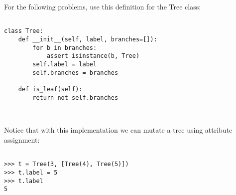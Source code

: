 For the following problems, use this definition for the Tree class:

\begin{lstlisting}

class Tree:
    def __init__(self, label, branches=[]):
        for b in branches:
            assert isinstance(b, Tree)
        self.label = label
        self.branches = branches

    def is_leaf(self):
        return not self.branches
        
        
\end{lstlisting}
\vspace{10}
Notice that with this implementation we can mutate a tree using attribute
assignment:

\begin{lstlisting}

>>> t = Tree(3, [Tree(4), Tree(5)])
>>> t.label = 5
>>> t.label
5


\end{lstlisting}